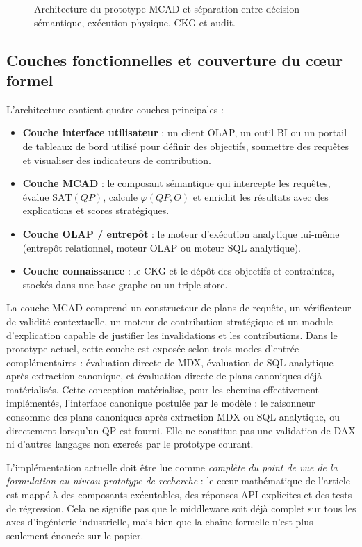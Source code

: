 \documentclass[journal]{IEEEtran}
\begin{document}
\begin{figure}[!t]
\centering
\resizebox{\textwidth}{!}{}
\caption{Architecture du prototype MCAD et séparation entre décision sémantique, exécution physique, CKG et audit.}
\label{fig:arch-mcad}
\end{figure}

\subsection{Couches fonctionnelles et couverture du cœur formel}

L'architecture contient quatre couches principales :
\begin{itemize}
  \item \textbf{Couche interface utilisateur} : un client OLAP, un outil BI ou un portail de tableaux de bord utilisé pour définir des objectifs, soumettre des requêtes et visualiser des indicateurs de contribution.
  \item \textbf{Couche MCAD} : le composant sémantique qui intercepte les requêtes, évalue $\mathrm{SAT}(QP)$, calcule $\varphi(QP,O)$ et enrichit les résultats avec des explications et scores stratégiques.
  \item \textbf{Couche OLAP / entrepôt} : le moteur d'exécution analytique lui-même (entrepôt relationnel, moteur OLAP ou moteur SQL analytique).
  \item \textbf{Couche connaissance} : le CKG et le dépôt des objectifs et contraintes, stockés dans une base graphe ou un triple store.
\end{itemize}
La couche MCAD comprend un constructeur de plans de requête, un vérificateur de validité contextuelle, un moteur de contribution stratégique et un module d'explication capable de justifier les invalidations et les contributions. Dans le prototype actuel, cette couche est exposée selon trois modes d'entrée complémentaires : évaluation directe de MDX, évaluation de SQL analytique après extraction canonique, et évaluation directe de plans canoniques déjà matérialisés. Cette conception matérialise, pour les chemins effectivement implémentés, l'interface canonique postulée par le modèle : le raisonneur consomme des plans canoniques après extraction MDX ou SQL analytique, ou directement lorsqu'un QP est fourni. Elle ne constitue pas une validation de DAX ni d'autres langages non exercés par le prototype courant.

L'implémentation actuelle doit être lue comme \emph{complète du point de vue de la formulation au niveau prototype de recherche} : le cœur mathématique de l'article est mappé à des composants exécutables, des réponses API explicites et des tests de régression. Cela ne signifie pas que le middleware soit déjà complet sur tous les axes d'ingénierie industrielle, mais bien que la chaîne formelle n'est plus seulement énoncée sur le papier.
\end{document}
